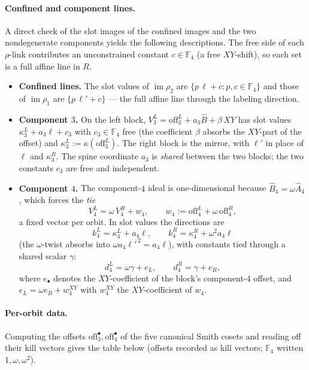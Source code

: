 \documentclass[11pt]{article}
\newcommand{\F}[1]{\mathbb{F}_{#1}}
\DeclareMathOperator{\img}{im}
\newcommand{\hA}{\hat{A}}
\newcommand{\hB}{\hat{B}}
\newcommand{\slab}{\ell}                          %
\theoremstyle{plain}
\theoremstyle{definition}
\theoremstyle{remark}
\begin{document}
\paragraph{Confined and component lines.}
A direct check of the slot images of the confined images and the two
nondegenerate components yields the following descriptions. The free side of
each $\rho$-link contributes an unconstrained constant $c\in\F4$ (a free
$XY$-shift), so each set is a full affine line in $R$.

\begin{itemize}
\item \textbf{Confined lines.} The slot values of $\img\rho_2$ are
  $\{p\,\slab+c:p,c\in\F4\}$ and those of $\img\rho_1$ are
  $\{p\,\slab'+c\}$ --- the full affine line through the labeling direction.

\item \textbf{Component $3$.} On the left block,
  $V_3^L=\mathrm{off}_3^L+a_3\hB+\beta\,XY$ has slot values
  $\kappa_3^L+a_3\slab+c_3$ with $c_3\in\F4$ free (the coefficient $\beta$
  absorbs the $XY$-part of the offset) and $\kappa_3^L:=\kappa(\mathrm{off}_3^L)$.
  The right block is the mirror, with $\slab'$ in place of $\slab$ and
  $\kappa_3^R$. The spine coordinate $a_3$ is \emph{shared} between the two
  blocks; the two constants $c_3$ are free and independent.

\item \textbf{Component $4$.} The component-$4$ ideal is one-dimensional
  because $\hB_4=\omega\hA_4$, which forces the \emph{tie}
  \[
    V_4^L=\omega\,V_4^R+w_4,\qquad w_4:=\mathrm{off}_4^L+\omega\,\mathrm{off}_4^R,
  \]
  a fixed vector per orbit. In slot values the directions are
  \[
    k_4^L=\kappa_4^L+a_4\slab,\qquad k_4^R=\kappa_4^R+\omega^2 a_4\slab
  \]
  (the $\omega$-twist absorbs into $\omega a_4\slab'^{\,2}=a_4\slab$), with
  constants tied through a shared scalar $\gamma$:
  \[
    d_4^L=\omega\gamma+e_L,\qquad d_4^R=\gamma+e_R,
  \]
  where $e_\bullet$ denotes the $XY$-coefficient of the block's
  component-$4$ offset, and $e_L=\omega e_R+w_4^{XY}$ with $w_4^{XY}$ the
  $XY$-coefficient of $w_4$.
\end{itemize}

\paragraph{Per-orbit data.}
Computing the offsets $\mathrm{off}_3^\bullet,\mathrm{off}_4^\bullet$ of the
five canonical Smith cosets and reading off their kill vectors gives the table
below (offsets recorded as kill vectors; $\F4$ written $1,\omega,\omega^2$).
\end{document}
